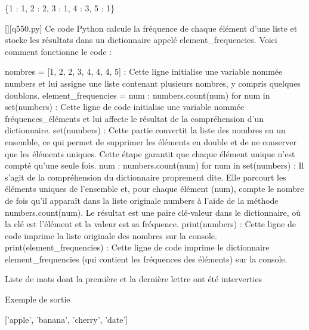 \{1 : 1, 2 : 2, 3 : 1, 4 : 3, 5 : 1\}
        \par
        \begin{solution}
            \renewcommand{\nomfichier}{q550.py}
            \pythonfile{\chemincode \nomfichier}[][\nomfichier]
            Ce code Python calcule la fréquence de chaque élément d'une liste et stocke les résultats dans un dictionnaire appelé element\_frequencies. Voici comment fonctionne le code :

    nombres = [1, 2, 2, 3, 4, 4, 4, 5] : Cette ligne initialise une variable nommée numbers et lui assigne une liste contenant plusieurs nombres, y compris quelques doublons.
    element\_frequencies = {num : numbers.count(num) for num in set(numbers)} : Cette ligne de code initialise une variable nommée fréquences\_éléments et lui affecte le résultat de la compréhension d'un dictionnaire.
        set(numbers) : Cette partie convertit la liste des nombres en un ensemble, ce qui permet de supprimer les éléments en double et de ne conserver que les éléments uniques. Cette étape garantit que chaque élément unique n'est compté qu'une seule fois.
        {num : numbers.count(num) for num in set(numbers)} : Il s'agit de la compréhension du dictionnaire proprement dite. Elle parcourt les éléments uniques de l'ensemble et, pour chaque élément (num), compte le nombre de fois qu'il apparaît dans la liste originale numbers à l'aide de la méthode numbers.count(num). Le résultat est une paire clé-valeur dans le dictionnaire, où la clé est l'élément et la valeur est sa fréquence.
    print(numbers) : Cette ligne de code imprime la liste originale des nombres sur la console.
    print(element\_frequencies) : Cette ligne de code imprime le dictionnaire element\_frequencies (qui contient les fréquences des éléments) sur la console.
        \end{solution}
        

        \question
        Liste de mots dont la première et la dernière lettre ont été interverties

Exemple de sortie

['apple', 'banana', 'cherry', 'date']

